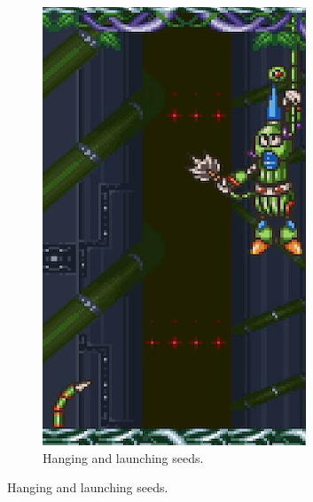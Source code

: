 \begin{figure}[htp]
\begin{minipage}{0.4\linewidth}
\begin{subfigure}{\linewidth}
			\centering
			\includegraphics[width=\linewidth]{figures/X2/Wire_sponge/Sponge_hang.jpg}
			\caption{Hanging and launching seeds.}
		\end{subfigure}
	\end{minipage}
\end{figure}
